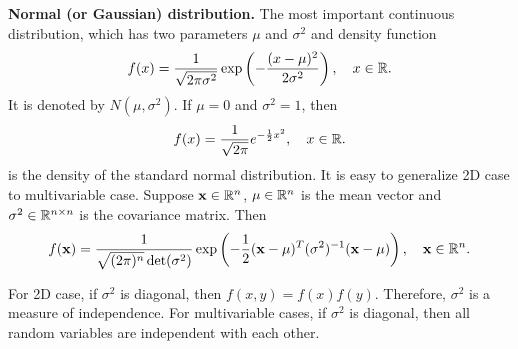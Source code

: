 \begin{example}
\textbf{Normal (or Gaussian) distribution.} The most important continuous distribution, which has two parameters $\mu$ and $\sigma^2$ and density function
\begin{equation*}
    f(x) = \frac{1}{\sqrt{2\pi\sigma^2}} \exp \left( -\frac{(x-\mu)^2}{2\sigma^2} \right), \quad x\in\mathbb{R}. 
\end{equation*}
It is denoted by $N(\mu, \sigma^2)$. If $\mu=0$ and $\sigma^2=1$, then
\begin{equation*}
    f(x) = \frac{1}{\sqrt{2\pi}} e^{-\frac{1}{2}x^2}, \quad x\in\mathbb{R}.
\end{equation*}
is the density of the standard normal distribution. It is easy to generalize 2D case to multivariable case. Suppose $\mathbf{x} \in \mathbb{R}^n$, $\mathbf{\mu} \in \mathbb{R}^n$ is the mean vector and $\mathbf{\sigma}^2 \in \mathbb{R}^{n\times n}$ is the covariance matrix. Then
\begin{equation*}
    f(\mathbf{x}) = \frac{1}{\sqrt{(2\pi)^n} \det(\mathbf{\sigma}^2)} \exp \left( -\frac{1}{2} (\mathbf{x}-\mathbf{\mu})^T (\mathbf{\sigma}^2)^{-1} (\mathbf{x}-\mathbf{\mu}) \right), \quad \mathbf{x} \in \mathbb{R}^n.
\end{equation*}

\begin{remark}
For 2D case, if $\sigma^2$ is diagonal, then $f(x,y) = f(x)f(y)$. Therefore, $\sigma^2$ is a measure of independence. For multivariable cases, if $\sigma^2$ is diagonal, then all random variables are independent with each other.
\end{remark}
\end{example}


